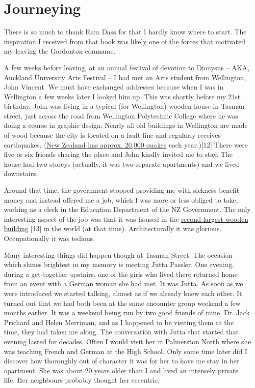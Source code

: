 \chapter{Journeying}

There is so much to thank Ram Dass for that I hardly know where to
start. The inspiration I received from that book was likely one of the
forces that motivated my leaving the Gordonton commune.

A few weeks before leaving, at an annual festival of devotion to
Dionysus -- AKA, Auckland University Arts Festival -- I had met an Arts
student from Wellington, John Vincent. We must have exchanged addresses
because when I was in Wellington a few weeks later I looked him up. This
was shortly before my 21st birthday. John was living in a typical (for
Wellington) wooden house in Tasman street, just across the road from
Wellington Polytechnic College where he was doing a course in graphic
design. Nearly all old buildings in Wellington are made of wood because
the city is located on a fault line and regularly receives earthquakes.
(\href{https://www.virtualoceania.net/newzealand/maps/newzealand-earthquake-risk.shtml}{\underline{New
Zealand} \underline{has approx. 20,000 quakes}} each year.){[}12{]}
There were five or six friends sharing the place and John kindly invited
me to stay. The house had two storeys (actually, it was two separate
apartments) and we lived downstairs.

Around that time, the government stopped providing me with sickness
benefit money and instead offered me a job, which I was more or less
obliged to take, working as a clerk in the Education Department of the
NZ Government. The only interesting aspect of the job was that it was
housed in the
\href{https://en.wikipedia.org/wiki/Old_Government_Buildings,_Wellington}{\underline{second
largest wooden building}} {[}13{]} in the world (at that time).
Architecturally it was glorious. Occupationally it was tedious.

Many interesting things did happen though at Tasman Street. The occasion
which shines brightest in my memory is meeting Jutta Passler. One
evening, during a get-together upstairs, one of the girls who lived
there returned home from an event with a German woman she had met. It
was Jutta. As soon as we were introduced we started talking, almost as
if we already knew each other. It turned out that we had both been at
the same encounter group weekend a few months earlier. It was a weekend
being run by two good friends of mine, Dr. Jack Prichard and Helen
Merriman, and as I happened to be visiting them at the time, they had
taken me along. The conversation with Jutta that started that evening
lasted for decades. Often I would visit her in Palmerston North where
she was teaching French and German at the High School. Only some time
later did I discover how thoroughly out of character it was for her to
have me stay in her apartment. She was about 20 years older than I and
lived an intensely private life. Her neighbours probably thought her
eccentric.

